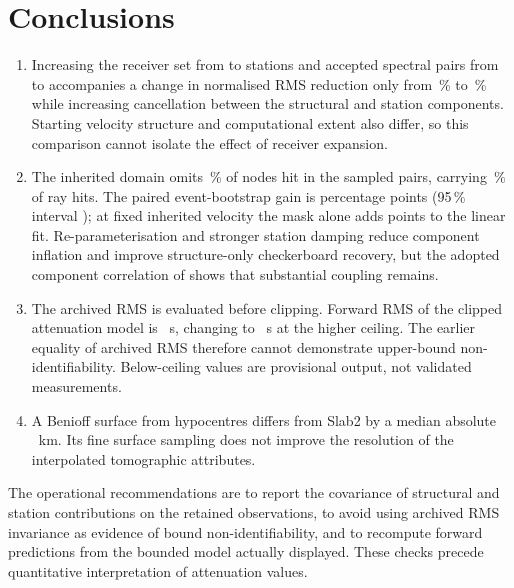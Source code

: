 \documentclass[review,authoryear,longtitle]{elsarticle}
\begin{document}
\section{Conclusions}

\begin{enumerate}
 \item Increasing the receiver set from \estPrevia{} to \estAdoptada{}
stations and accepted spectral pairs from \qObsPrevia{} to
\qObsAdoptada{} accompanies a change in normalised RMS reduction only from
 \explPrevia\,\% to \explMascaraVieja\,\% while increasing cancellation
between the structural and station components. Starting velocity structure
and computational extent also differ, so this comparison cannot isolate
the effect of receiver expansion.
 \item The inherited domain omits \fracCeldasFuera\,\% of nodes hit in
 the sampled pairs, carrying \fracImpactosFuera\,\% of ray hits.
 The paired event-bootstrap gain is \auditDomainGain{} percentage points
 (95\,\% interval \auditDomainGainCI); at fixed inherited velocity the
 mask alone adds \auditMaskGainFixedVp{} points to the linear fit.
 Re-parameterisation and stronger station damping reduce component
 inflation and improve structure-only checkerboard recovery, but the
 adopted component correlation of \corrComponentesAdoptada{} shows
 that substantial coupling remains.
 \item The archived RMS is evaluated before clipping. Forward RMS of
 the clipped attenuation model is \rmsQRecortado~s, changing to
 \rmsQRecortadoAlto~s at the higher ceiling. The earlier equality of
 archived RMS therefore cannot demonstrate upper-bound non-identifiability.
 Below-ceiling values are provisional output, not validated measurements.
 \item A Benioff surface from \losaControles{} hypocentres differs from
 Slab2 by a median absolute \slabDifAbs~km. Its fine surface sampling does
 not improve the resolution of the interpolated tomographic attributes.
\end{enumerate}

The operational recommendations are to report the covariance of structural
and station contributions on the retained observations, to avoid using
archived RMS invariance as evidence of bound non-identifiability, and to
recompute forward predictions from the bounded model actually displayed.
These checks precede quantitative interpretation of attenuation values.
\end{document}
